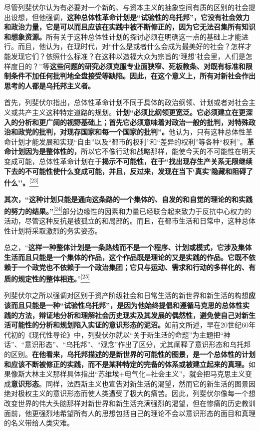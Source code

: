 \documentclass[UTF8, fontset = sourcesans, a4paper, oneside, zihao =
-4, scheme=chinese, no-math, space=true]{ctexbook}
\begin{document}
尽管列斐伏尔认为有必要对一个新的、与资本主义的抽象空间有质的区别的社会提出设想，但他强调，\textbf{这种总体性革命计划是``试验性的乌托邦''，它没有社会效力和政治力量，它是可以而且应该在实践中被不断修正的，因为它无法召集所有知识和想象资源。}所有关于这种总体性计划的探讨必须在明确这一点的基础上才能进行。而且，他认为，在现时代，对``什么是或者什么会成为最美好的社会？怎样才能发现它们？依照什么标准？在这种以造福大众为宗旨的`理想'社会里，人们是怎样度日的？''等\textbf{这些问题的研究必须克服专业面狭窄、死板教条、对既有标准和限制条件不加任何批判地全盘接受等缺陷。因此，在这个意义上，所有对新社会作出思考的人都是乌托邦主义者。}

首先，列斐伏尔指出，总体性革命计划不同于具体的政治纲领、计划或者对社会主义或共产主义这种特定道路的规划。\textbf{计划``必须比纲领更宽泛。它必须建立在更深入的分析和更广阔的视野基础上；首先它必须意味着对政治一般的批判，对特殊政治和政党的批判，对现存国家和每一个国家的批判''。}他认为，只有这种总体性革命计划才能发展和实现``自由''以及``都市的权利''和``差异的权利''等各种``权利''。\textbf{革命计划因为是整体性的，}所以它不像行动和战略那样，能使今天的不可能性在明天变成可能，总体性革命计划在于\textbf{揭示不可能性，在于``找出现存生产关系无限继续下去的不可能性使什么变成可能，并且，反过来，发现在当下`真实'隐藏和阻碍了什么''。}\protect\hypertarget{part0008_split_002.htmlux5cux23w23}{}{}\protect\hyperlink{part0008_split_003.htmlux5cux23m23}{\textsuperscript{{[}23{]}}}

\textbf{其次，``这种计划只能是通向这条路的一个集体的、自发的和自觉的理论的和实践的努力的结果。''}\protect\hypertarget{part0008_split_002.htmlux5cux23w24}{}{}\protect\hyperlink{part0008_split_003.htmlux5cux23m24}{\textsuperscript{{[}24{]}}}部分边缘性的因素和力量已经联合起来致力于反抗中心权力的活动，尽管这种反抗是被孤立的和局部的。而且，在都市生活和日常中，这种总体性计划将采取激烈的务实姿态。

总之，``\textbf{这样一种整体计划是一条路线而不是一个程序、计划或模式，它涉及集体生活而且只能是一个集体的作品，这个作品既是理论的又是实践的作品。它既不依赖于一个政党也不依赖于一个政治集团；它只与运动、需求和行动的多样化的、有质的规定性的整体相连。}''\protect\hypertarget{part0008_split_002.htmlux5cux23w25}{}{}\protect\hyperlink{part0008_split_003.htmlux5cux23m25}{\textsuperscript{{[}25{]}}}

列斐伏尔之所以强调对区别于资产阶级社会和日常生活的新世界和新生活的构想\textbf{应该而且只能是一种``试验性乌托邦''，是因为他始终提倡和遵循马克思的总体性实践的方法，辩证地分析和理解社会历史现实及其发展的偶然性，避免使自己对新生活可能性的分析和规划陷入实证的意识形态的泥沼。}如前文所述，早在20世纪60年代初的《现代性导论》中，列斐伏尔就以``关于新生活的命题''为主题把``神话''、``意识形态''、``乌托邦''、``观念''作出了区分，尤其阐释了意识形态和乌托邦的区别。\textbf{在他看来，乌托邦描述的是新世界的可能性的图景，是一个总体性的计划和应该不断被修正的实践，而不是某种特定的完备的体系或被建立起来的真理。}如果像斯大林主义那样具体指出``苏维埃+电气化=社会主义''，就会把马克思主义变成\textbf{意识形态}。同样，法西斯主义也宣告对新生活的渴望，然而它的新生活的图景因绝对极权主义的意识形态而使人类遭受了极大的痛苦。因此，列斐伏尔像每一个想改变世界的伟大头脑那样对新世界和新生活充满强烈的渴望，但在惨痛的历史教训面前，他更强烈地希望所有人的思想包括自己的理论不会以意识形态的面目和真理的名义带给人类灾难。
\end{document}
